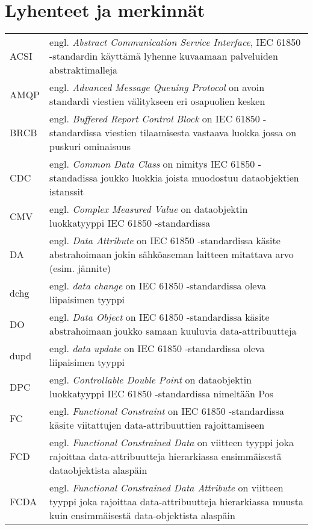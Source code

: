 \chapter*{Lyhenteet ja merkinnät}
\label{ch:lyhenteetjamerkinnat}

\begin{tabularx}{\linewidth}[h]{@{} p{} p{} @{}}
	ACSI & engl. \emph{Abstract Communication Service Interface}, IEC 61850 -standardin käyttämä lyhenne kuvaamaan palveluiden abstraktimalleja \\
	AMQP & engl. \emph{Advanced Message Queuing Protocol} on avoin standardi viestien välitykseen eri osapuolien kesken \\
	BRCB & engl. \emph{Buffered Report Control Block} on IEC 61850 -standardissa viestien tilaamisesta vastaava luokka jossa on puskuri ominaisuus \\
	CDC & engl. \emph{Common Data Class} on nimitys IEC 61850 -standadissa joukko luokkia joista muodostuu dataobjektien istanssit \\
	CMV & engl. \emph{Complex Measured Value} on dataobjektin luokkatyyppi IEC 61850 -standardissa \\
	DA & engl. \emph{Data Attribute} on IEC 61850 -standardissa käsite abstrahoimaan jokin sähköaseman laitteen mitattava arvo (esim. jännite) \\
	dchg & engl. \emph{data change} on IEC 61850 -standardissa oleva liipaisimen tyyppi \\
	DO & engl. \emph{Data Object} on IEC 61850 -standardissa käsite abstrahoimaan joukko samaan kuuluvia data-attribuutteja \\
	dupd & engl. \emph{data update} on IEC 61850 -standardissa oleva liipaisimen tyyppi \\
	DPC & engl. \emph{Controllable Double Point} on dataobjektin luokkatyyppi IEC 61850 -standardissa nimeltään Pos \\
	FC & engl. \emph{Functional Constraint} on IEC 61850 -standardissa käsite viitattujen data-attribuuttien rajoittamiseen \\
	FCD & engl. \emph{Functional Constrained Data} on viitteen tyyppi joka rajoittaa data-attribuutteja hierarkiassa ensimmäisestä dataobjektista alaspäin \\
	FCDA & engl. \emph{Functional Constrained Data Attribute} on viitteen tyyppi joka rajoittaa data-attribuutteja hierarkiassa muusta kuin ensimmäisestä data-objektista alaspäin \\

\end{tabularx}
